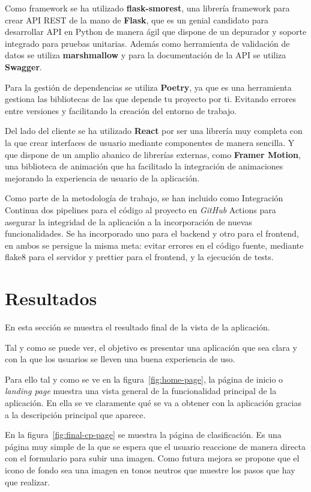 Como framework se ha utilizado \textbf{flask-smorest}, una librería framework para crear API REST de la mano de
\textbf{Flask}, que es un genial candidato para desarrollar API en Python de manera ágil que dispone de un depurador
y soporte integrado para pruebas unitarias.
Además como herramienta de validación de datos se utiliza \textbf{marshmallow} y para la documentación de la API se utiliza
\textbf{Swagger}.

Para la gestión de dependencias se utiliza \textbf{Poetry}, ya que es una herramienta gestiona las bibliotecas de las que depende
tu proyecto por ti.
Evitando errores entre versiones y facilitando la creación del entorno de trabajo.

Del lado del cliente se ha utilizado \textbf{React} por ser una librería muy completa con la que crear interfaces de usuario
mediante componentes de manera sencilla.
Y que dispone de un amplio abanico de librerías externas, como \textbf{Framer Motion}, una biblioteca de animación que ha
facilitado la integración de animaciones mejorando la experiencia de usuario de la aplicación.

Como parte de la metodología de trabajo, se han incluido como Integración Continua dos pipelines para el código al
proyecto en \textit{GitHub} Actions para asegurar la integridad de la aplicación a la incorporación de nuevas funcionalidades.
Se ha incorporado uno para el backend y otro para el frontend, en ambos se persigue la misma meta: evitar errores en
el código fuente, mediante flake8 para el servidor y prettier para el frontend, y la ejecución de tests.


\section{Resultados}\label{sec:resultados}

En esta sección se muestra el resultado final de la vista de la aplicación.

Tal y como se puede ver, el objetivo es presentar una aplicación que sea clara y con la que los usuarios se lleven una
buena experiencia de uso.

Para ello tal y como se ve en la figura~\ref{fig:home-page}, la página de inicio o \textit{landing page} muestra una vista
general de la funcionalidad principal de la aplicación.
En ella se ve claramente qué se va a obtener con la aplicación gracias a la descripción principal que aparece.

En la figura~\ref{fig:final-cp-page} se muestra la página de clasificación.
Es una página muy simple de la que se espera que el usuario reaccione de manera directa con el formulario para subir
una imagen.
Como futura mejora se propone que el icono de fondo sea una imagen en tonos neutros que muestre los pasos que hay que
realizar.

